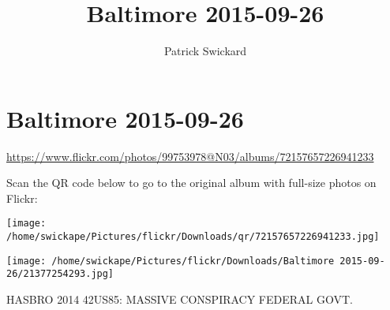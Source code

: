 \documentclass[10pt,letterpaper]{article}
\title{Baltimore 2015-09-26}
\author{Patrick Swickard}
\date{}
\begin{document}
\section*{Baltimore 2015-09-26}

\url{https://www.flickr.com/photos/99753978@N03/albums/72157657226941233}

Scan the QR code below to go to the original album with full-size photos on Flickr:

\texttt{[image: /home/swickape/Pictures/flickr/Downloads/qr/72157657226941233.jpg]}
\pagebreak

\texttt{[image: /home/swickape/Pictures/flickr/Downloads/Baltimore 2015-09-26/21377254293.jpg]}

HASBRO 2014 42US85: MASSIVE CONSPIRACY FEDERAL GOVT.
\pagebreak
\end{document}

